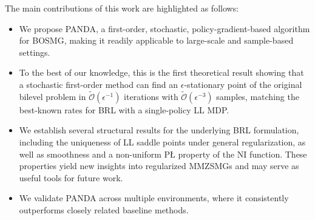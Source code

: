 \documentclass{article}
\theoremstyle{plain}
\theoremstyle{definition}
\theoremstyle{remark}
\newcommand{\st}{{\mathrm{s.t.}}}
\def\E{\mathbb E}
\def\cM{\mathcal M}
\def\cO{\mathcal O}
\begin{document}
\vspace{-1mm}
The main contributions of this work are highlighted as follows:
\vspace{-2mm}
\begin{itemize}
\item We propose PANDA, a first-order, stochastic, policy-gradient-based algorithm for BOSMG, making it readily applicable to large-scale and sample-based settings.
\item To the best of our knowledge, this is the first theoretical result showing that a stochastic first-order method can find an $\epsilon$-stationary point of the original bilevel problem in $\tilde{\cO}(\epsilon^{-1})$ iterations with $\tilde{\cO}(\epsilon^{-3})$ samples, matching the best-known rates for BRL with a single-policy LL MDP.
\item We establish several structural results for the underlying BRL formulation, including the uniqueness of LL saddle points under general regularization, as well as smoothness and a non-uniform P{\L} property of the NI function. These properties yield new insights into regularized MMZSMGs and may serve as useful tools for future work.
\item We validate PANDA across multiple environments, where it consistently outperforms closely related baseline methods.
\end{itemize}



\vspace{-2mm}
\end{document}
